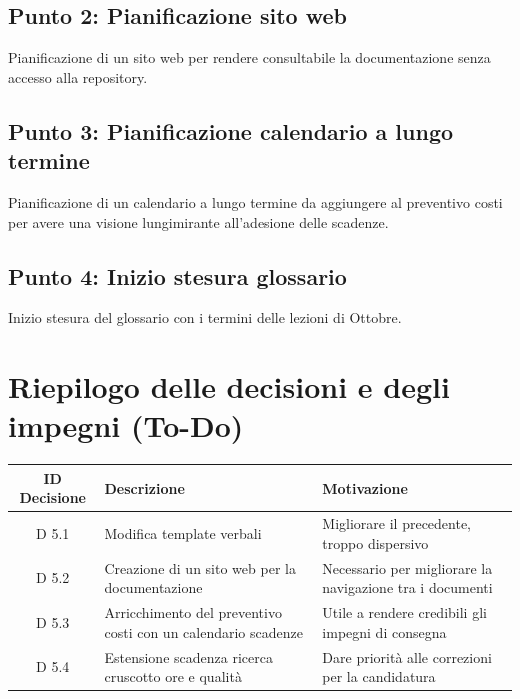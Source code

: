 \documentclass[a4paper, 11pt]{article}
\begin{document}
\subsection{Punto 2: Pianificazione sito web}
Pianificazione di un sito web per rendere consultabile la documentazione senza accesso alla repository.

\subsection{Punto 3: Pianificazione calendario a lungo termine}
Pianificazione di un calendario a lungo termine da aggiungere al preventivo costi per avere una visione lungimirante all'adesione delle scadenze.

\subsection{Punto 4: Inizio stesura glossario}
Inizio stesura del glossario con i termini delle lezioni di Ottobre.

\newpage


\section{Riepilogo delle decisioni e degli impegni (To-Do)}

\begin{tabularx}{\textwidth}{|c|X|X|}
    \hline
    \textbf{ID Decisione} & \textbf{Descrizione} & \textbf{Motivazione} \\ \hline
    D 5.1 & Modifica template verbali & Migliorare il precedente, troppo dispersivo\\ \hline
    D 5.2 & Creazione di un sito web per la documentazione & Necessario per migliorare la navigazione tra i documenti \\ \hline
    D 5.3 & Arricchimento del preventivo costi con un calendario scadenze & Utile a rendere credibili gli impegni di consegna \\ \hline
    D 5.4 & Estensione scadenza ricerca cruscotto ore e qualità & Dare priorità alle correzioni per la candidatura \\ \hline
\end{tabularx}

\vspace{2cm}
\end{document}
